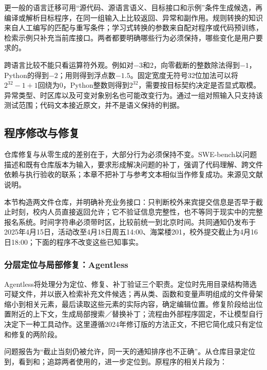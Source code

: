 更一般的语言迁移可用“源代码、源语言语义、目标接口和示例”条件生成候选，再编译或解析目标程序，在同一组输入上比较返回、异常和副作用。规则转换的知识来自人工编写的匹配与重写条件；学习式转换的参数来自配对程序或代码预训练，检索示例只补充当前库接口。两者都要明确哪些行为必须保持，哪些变化是用户要求的。

跨语言比较不能只看运算符外观。例如对$-3$和2，向零截断的整数除法得到$-1$，Python的得到$-2$；用\code{/}则得到浮点数$-1.5$。固定宽度无符号32位加法可以将$2^{32}-1+1$回绕为0，Python整数则得到$2^{32}$，需要按目标契约决定是否显式取模。异常类型、时区库以及可变对象别名也可能改变行为。通过一组对照输入只支持该测试范围；代码文本接近原文，并不是语义保持的判据。

\subsection{程序修改与修复}
\label{sec:nlp-execution-repair}

仓库修复与从零生成的差别在于，大部分行为必须保持不变。SWE-bench以问题描述和既有仓库版本为输入，要求形成解决问题的补丁，强调了代码理解、跨文件依赖与执行验收的联系；本章不把补丁与参考文本相似当作修复成功。来源见文献说明。

本节构造两文件仓库，并明确补充业务接口：只判断校外来宾提交信息是否早于截止时刻，校内人员直接返回允许；它不验证信息完整性，也不等同于现实中的完整报名系统。时间字符串必须带时区，比较前统一到北京时间。共同通知仍发布于2025年4月15日，活动改至4月18日周五14:00、海棠楼201，校外提交截止为4月16日18:00；下面的程序不改变这些已知事实。

\subsubsection{分层定位与局部修复：Agentless}
\label{sec:nlp-execution-agentless}

Agentless将处理分为定位、修复、补丁验证三个职责。定位时先用目录结构筛选可疑文件，并以嵌入检索补充文件候选；再从类、函数和变量声明组成的文件骨架缩小到相关元素，最后读取这些元素的实际内容，确定编辑位置。修复阶段给出位置附近的上下文，生成局部搜索／替换补丁；流程由外部程序固定，不让模型自行决定下一种工具动作。这里遵循2024年修订版的方法正文，不把它简化成只有定位和修复的两阶段。

问题报告为“截止当刻仍被允许，同一天的通知排序也不正确”。从仓库目录定位到，看到和；追踪两者使用的，进一步定位到。原程序的相关片段为：

